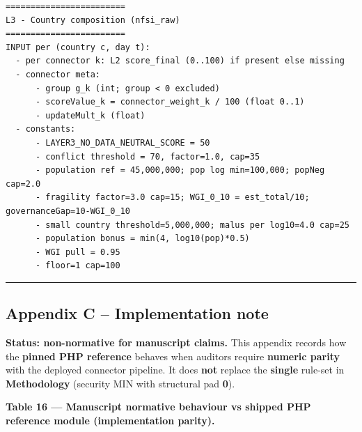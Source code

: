 \documentclass[
  11pt,
  peerreview,journal,onecolumn]{IEEEtran}
\begin{document}
\begin{lstlisting}
========================
L3 - Country composition (nfsi_raw)
========================
INPUT per (country c, day t):
  - per connector k: L2 score_final (0..100) if present else missing
  - connector meta:
      - group g_k (int; group < 0 excluded)
      - scoreValue_k = connector_weight_k / 100 (float 0..1)
      - updateMult_k (float)
  - constants:
      - LAYER3_NO_DATA_NEUTRAL_SCORE = 50
      - conflict threshold = 70, factor=1.0, cap=35
      - population ref = 45,000,000; pop log min=100,000; popNeg cap=2.0
      - fragility factor=3.0 cap=15; WGI_0_10 = est_total/10; governanceGap=10-WGI_0_10
      - small country threshold=5,000,000; malus per log10=4.0 cap=25
      - population bonus = min(4, log10(pop)*0.5)
      - WGI pull = 0.95
      - floor=1 cap=100
\end{lstlisting}

\begin{center}\rule{0.5\linewidth}{0.5pt}\end{center}

\hypertarget{appendix-c-implementation-note}{%
\subsection{Appendix C -- Implementation
note}\label{appendix-c-implementation-note}}

\textbf{Status: non-normative for manuscript claims.} This appendix
records how the \textbf{pinned PHP reference} behaves when auditors
require \textbf{numeric parity} with the deployed connector pipeline. It
does \textbf{not} replace the \textbf{single} rule-set in
\textbf{Methodology} (security MIN with structural pad \textbf{0}).

\textbf{Table 16 --- Manuscript normative behaviour vs shipped PHP
reference module (implementation parity).}
\end{document}
